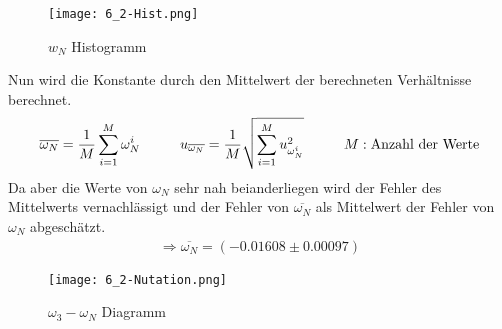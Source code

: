 \begin{figure}[ht]
    \centering
    \caption{$w_N$ Histogramm}
    \texttt{[image: 6\_2-Hist.png]}
\end{figure}
Nun wird die Konstante durch den Mittelwert der berechneten Verhältnisse berechnet.
\begin{align}   
    \overline{\omega_N} = \frac{1}{M}\sum_{i=1}^{M}\omega_N^i \tab u_{\overline{\omega_N}}= \frac{1}{M}\sqrt{\sum_{i=1}^{M}u_{\omega_N^i}^2} \tab M:\text{Anzahl der Werte}
\end{align}
Da aber die Werte von $\omega_N$ sehr nah beianderliegen wird der Fehler des Mittelwerts vernachlässigt und der Fehler von $\overline{\omega_N}$ als Mittelwert der Fehler von $\omega_N$ abgeschätzt.
\begin{align*}
    \Rightarrow\boxed{\overline{\omega_N}=(-0.01608\pm0.00097)}
\end{align*}
\newpage
\begin{figure}[ht]
    \centering
    \caption{$\omega_3-\omega_N$ Diagramm}
    \texttt{[image: 6\_2-Nutation.png]}
\end{figure}